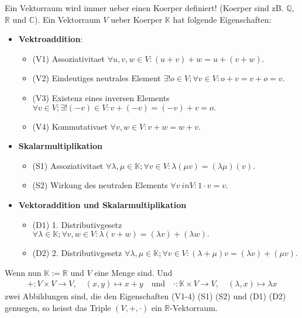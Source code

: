 \documentclass[12pt]{article}
\begin{document}
\begin{flushleft}
    Ein Vektorraum wird immer ueber einen Koerper definiert! (Koerper sind zB. $\mathbb{Q}$, $\mathbb{R}$ und $\mathbb{C}$).
    Ein Vektorraum $V$ ueber Koerper $\mathbb{K}$ hat folgende Eigenschaften:
    \begin{itemize}
        \item \textbf{Vektroaddition}:
        \begin{itemize}
            \item (V1) Assoziativitaet $\forall u,v,w \in V: (u + v) + w = u + (v + w).$
            \item (V2) Eindeutiges neutrales Element $\exists ! o \in V; \forall v \in V: o + v = v + o = v.$
            \item (V3) Existenz eines inversen Elements $\forall v \in V; \exists !(-v)\in V: v + (-v) = (-v) + v = o.$
            \item (V4) Kommutativaet $\forall v,w \in V: v + w = w + v.$
        \end{itemize}
        \item \textbf{Skalarmultiplikation}
        \begin{itemize}
            \item (S1) Assoziativitaet $\forall \lambda , \mu \in \mathbb{K}; \forall v \in V: \lambda(\mu v) = (\lambda \mu)(v).$
            \item (S2) Wirkung des neutralen Elements $\forall v \ in V: 1 \cdot v = v.$
        \end{itemize}
        \item \textbf{Vektoraddition und Skalarmultiplikation}
        \begin{itemize}
            \item (D1) 1. Distributivgesetz $\forall \lambda \in \mathbb{K}; \forall v,w \in V: \lambda(v + w) = (\lambda v) + (\lambda w).$
            \item (D2) 2. Distributivgesetz $\forall \lambda , \mu \in \mathbb{K}; \forall v \in V: (\lambda + \mu)v = (\lambda v) + (\mu v).$
        \end{itemize}
    \end{itemize}
    Wenn nun $\mathbb{K} := \mathbb{R}$ und $V$ eine Menge sind. Und \begin{align}
        +: V \times V \rightarrow V, \quad (x,y) \mapsto x + y \quad \text{und} \quad \cdot: \mathbb{K} \times V \to V, \quad (\lambda,x) \mapsto \lambda x
    \end{align}
    zwei Abbildungen sind, die den Eigenschaften (V1-4) (S1) (S2) und (D1) (D2) genuegen, so heisst das Triple $(V,+,\cdot)$ ein $\mathbb{R}$-Vektorraum.
\end{flushleft}
\end{document}
